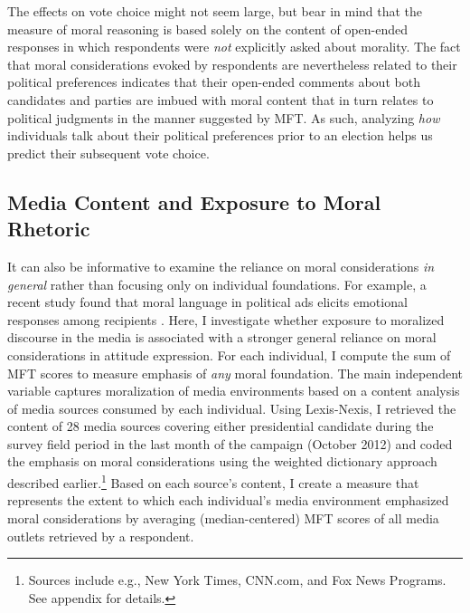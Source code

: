 \documentclass[12pt]{article}
\begin{document}
The effects on vote choice might not seem large, but bear in mind that the measure of moral reasoning is based solely on the content of open-ended responses in which respondents were \textit{not} explicitly asked about morality. The fact that moral considerations evoked by respondents are nevertheless related to their political preferences indicates that their open-ended comments about both candidates and parties are imbued with moral content that in turn relates to political judgments in the manner suggested by MFT. As such, analyzing \textit{how} individuals talk about their political preferences prior to an election helps us predict their subsequent vote choice.


\subsection*{Media Content and Exposure to Moral Rhetoric}

It can also be informative to examine the reliance on moral considerations \textit{in general} rather than focusing only on individual foundations. For example, a recent study found that moral language in political ads elicits emotional responses among recipients \citep{lipsitz2017playing}. Here, I investigate whether exposure to moralized discourse in the media is associated with a stronger general reliance on moral considerations in attitude expression. For each individual, I compute the sum of MFT scores to measure emphasis of \textit{any} moral foundation. The main independent variable captures moralization of media environments based on a content analysis of media sources consumed by each individual. Using Lexis-Nexis, I retrieved the content of 28 media sources covering either presidential candidate during the survey field period in the last month of the campaign (October 2012) and coded the emphasis on moral considerations using the weighted dictionary approach described earlier.\footnote{Sources include e.g., New York Times, CNN.com, and Fox News Programs. See appendix for details.} Based on each source's content, I create a measure that represents the extent to which each individual's media environment emphasized moral considerations by averaging (median-centered) MFT scores of all media outlets retrieved by a respondent.
\end{document}
